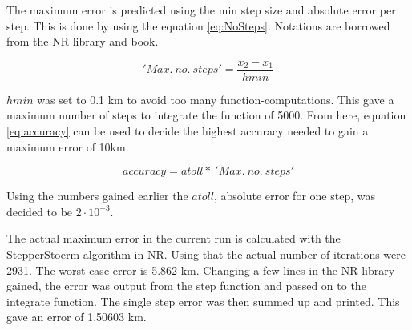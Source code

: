 The maximum error is predicted using the min step size and absolute error per step.
This is done by using the equation \ref{eq:NoSteps}.
Notations are borrowed from the NR library and book.

\begin{equation}
'Max.\ no.\ steps' = \frac{x_2 - x_1}{hmin}
\label{eq:NoSteps}
\end{equation}

$hmin$ was set to 0.1 km to avoid too many function-computations.
This gave a maximum number of steps to integrate the function of 5000.
From here, equation \ref{eq:accuracy} can be used to decide the highest accuracy needed to gain a maximum error of 10km.

\begin{equation}
accuracy = atoll *\ 'Max.\ no.\ steps'
\label{eq:accuracy}
\end{equation}

Using the numbers gained earlier the $atoll$, absolute error for one step, was decided to be $2\cdot10^{-3}$.

The actual maximum error in the current run is calculated with the StepperStoerm algorithm in NR.
Using that the actual number of iterations were 2931. The worst case error is 5.862 km.
Changing a few lines in the NR library gained, the error was output from the step function and passed on to the integrate function.
The single step error was then summed up and printed.
This gave an error of 1.50603 km. 

